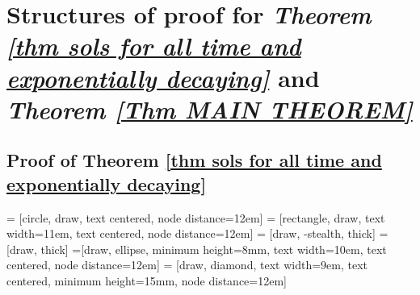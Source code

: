 \documentclass{article}
\begin{document}
\newpage

\section{Structures of proof for 
\emph{Theorem \ref{thm sols for all time and exponentially decaying}} and \emph{Theorem \ref{Thm MAIN THEOREM}}}
\label{App flowcharts}

\subsection{Proof of Theorem \ref{thm sols for all time and exponentially decaying}}

 = [circle, draw, text centered, node distance=12em]
 = [rectangle, draw, text width=11em, text centered, node distance=12em]
 = [draw, -stealth, thick]
 = [draw, thick]
=[draw, ellipse, minimum height=8mm, text width=10em, text centered, node distance=12em]
 = [draw, diamond, text width=9em, text centered, minimum height=15mm, node distance=12em]
\end{document}
